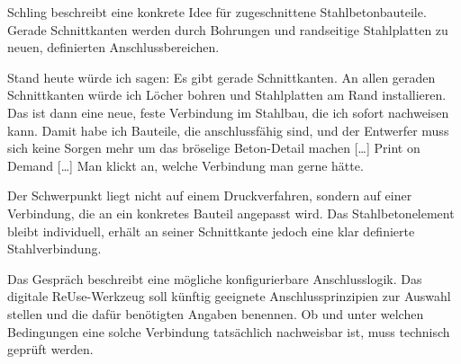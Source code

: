 Schling beschreibt eine konkrete Idee für zugeschnittene Stahlbetonbauteile. Gerade Schnittkanten werden durch Bohrungen und randseitige Stahlplatten zu neuen, definierten Anschlussbereichen.

\begin{Blockquote}
Stand heute würde ich sagen: Es gibt gerade Schnittkanten. An allen geraden Schnittkanten würde ich Löcher bohren und Stahlplatten am Rand installieren. Das ist dann eine neue, feste Verbindung im Stahlbau, die ich sofort nachweisen kann. Damit habe ich Bauteile, die anschlussfähig sind, und der Entwerfer muss sich keine Sorgen mehr um das bröselige Beton-Detail machen […] Print on Demand […] Man klickt an, welche Verbindung man gerne hätte.
\end{Blockquote}

Der Schwerpunkt liegt nicht auf einem Druckverfahren, sondern auf einer Verbindung, die an ein konkretes Bauteil angepasst wird. Das Stahlbetonelement bleibt individuell, erhält an seiner Schnittkante jedoch eine klar definierte Stahlverbindung.

Das Gespräch beschreibt eine mögliche konfigurierbare Anschlusslogik. Das digitale ReUse-Werkzeug soll künftig geeignete Anschlussprinzipien zur Auswahl stellen und die dafür benötigten Angaben benennen. Ob und unter welchen Bedingungen eine solche Verbindung tatsächlich nachweisbar ist, muss technisch geprüft werden.
